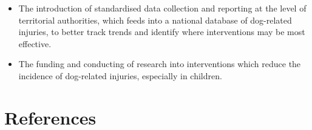 \documentclass[
  letterpaper,
  DIV=11,
  numbers=noendperiod]{scrartcl}
\begin{document}
\begin{itemize}
  The amendment of legislation to require that dogs are properly fenced
  or constrained on their property to prevent roaming and attacks,
  especially on children, the elderly, disabled, and other vulnerable
  groups.
\item
  The introduction of standardised data collection and reporting at the
  level of territorial authorities, which feeds into a national database
  of dog-related injuries, to better track trends and identify where
  interventions may be most effective.
\item
  The funding and conducting of research into interventions which reduce
  the incidence of dog-related injuries, especially in children.
\end{itemize}

\section{References}\label{references}
\end{document}
